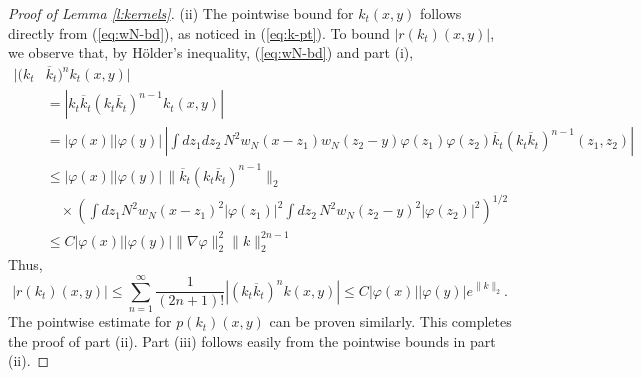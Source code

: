 \documentclass[11pt,a4paper,DIV11]{scrartcl}	%
\begin{document}
\begin{proof}[Proof of Lemma \ref{l:kernels}]
(ii) The pointwise bound for $k_t(x,y)$ follows directly from (\ref{eq:wN-bd}), as noticed in (\ref{eq:k-pt}). To bound $\lvert r (k_t) (x,y)\rvert$, we observe that, by H\"older's inequality, (\ref{eq:wN-bd}) and part (i),
  \begin{align*}
    |( k_t &\overline{k}_t)^n k_t(x,y)| \\ & = | k_t \overline{k}_t ( k_t \overline{k}_t)^{n-1}
    k_t (x,y)| \\
    & = |\varphi(x)| |\varphi(y)| \, \left| \int dz_1 dz_2 \, N^2 w_N(x-z_1)
    w_N(z_2-y) \varphi(z_1) \varphi(z_2) \overline{k}_t (k_t
    \overline{k}_t)^{n-1}(z_1,z_2) \right| \\
    & \le |\varphi(x)| |\varphi(y)| \, \| \overline{k}_t (k_t \overline{k}_t)^{n-1}
    \|_{2} \\
    & \quad \times \left( \int dz_1 N^2 w_N(x-z_1)^2 |\varphi(z_1)|^2 \int
    dz_2 \, N^2 w_N(z_2-y)^2 |\varphi(z_2)|^2 \right)^{1/2} \\
    & \le C |\varphi(x)| |\varphi(y)|  \| \nabla \varphi \|_{2}^2 \| k
    \|_{2}^{2n-1}
  \end{align*}
  Thus,
  \[
    |r(k_t) (x,y)| \le \sum_{n=1}^\infty \frac{1}{(2n+1)!} |( k_t \overline{k}_t)^n k
    (x,y)|\le C |\varphi(x)| |\varphi(y)| e^{\| k \|_2}.
  \]
  The pointwise estimate for $p (k_t) (x,y)$ can be proven similarly. 
  This completes the proof of part (ii). Part (iii) follows easily from the pointwise bounds in part (ii).
\end{proof}
\end{document}

